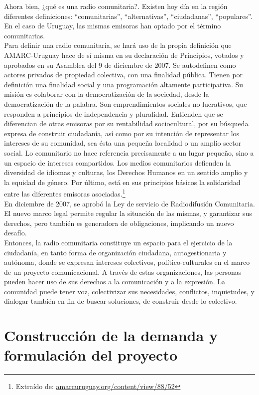 Ahora bien, ¿qué es una radio comunitaria?. Existen hoy día en la región diferentes definiciones: “comunitarias”, “alternativas”, “ciudadanas”, “populares”. En el caso de Uruguay, las mismas emisoras han optado por el término comunitarias.\\

Para definir una radio comunitaria, se hará uso de la propia definición que AMARC-Uruguay hace de sí misma en su declaración de Principios, votados y aprobados en su Asamblea del 9 de diciembre de 2007. Se autodefinen como actores privados de propiedad colectiva, con una finalidad pública. Tienen por definición una finalidad social y una programación altamente participativa. Su misión es colaborar con la democratización de la sociedad, desde la democratización de la palabra. Son emprendimientos sociales no lucrativos, que responden a principios de independencia y pluralidad. Entienden que se diferencian de otras emisoras por su rentabilidad sociocultural, por su búsqueda expresa de construir ciudadanía, así como por su intención de representar los intereses de su comunidad, sea ésta una pequeña localidad o un amplio sector social. Lo comunitario no hace referencia precisamente a un lugar pequeño, sino a un espacio de intereses compartidos. Los medios comunitarios defienden la diversidad de idiomas y culturas, los Derechos Humanos en un sentido amplio y la equidad de género. Por último, está en sus principios básicos la solidaridad entre las diferentes emisoras asociadas.\footnote{Extraído de: \href{http://amarcuruguay.org/content/view/88/52}{amarcuruguay.org/content/view/88/52}}\\

En diciembre de 2007, se aprobó la Ley de servicio de Radiodifusión Comunitaria. El nuevo marco legal permite regular la situación de las mismas, y garantizar sus derechos, pero también es generadora de obligaciones, implicando un nuevo desafío.\\

Entonces, la radio comunitaria constituye un espacio para el ejercicio de la ciudadanía, en tanto forma de organización ciudadana, autogestionaria y autónoma, donde se expresan intereses colectivos, político-culturales en el marco de un proyecto comunicacional. A través de estas organizaciones, las personas pueden hacer uso de sus derechos a la comunicación y a la expresión. La comunidad puede tener voz, colectivizar sus necesidades, conflictos, inquietudes, y dialogar también en fin de buscar soluciones, de construir desde lo colectivo.
\newpage
\section{Construcción de la demanda y formulación del proyecto}


